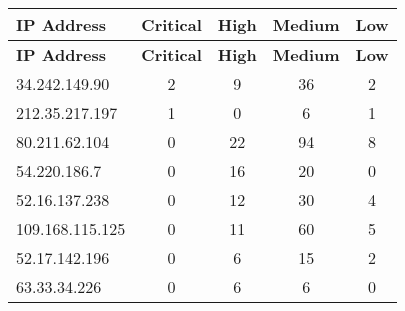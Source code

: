 \documentclass{article}
\begin{document}
\begin{longtable}{|>{\raggedright\arraybackslash}p{3cm}|c|c|c|c|}
    \hline
    \textbf{IP Address} & \textbf{Critical} & \textbf{High} & \textbf{Medium} & \textbf{Low} \\
    \hline
    \endfirsthead
    \hline
    \textbf{IP Address} & \textbf{Critical} & \textbf{High} & \textbf{Medium} & \textbf{Low} \\
    \hline
    \endhead
    \hline
    \endfoot
    \endlastfoot
    
    
    
    \rowcolor{lightred} %
    
    34.242.149.90 & 2 & 9 & 36 & 2 \\
    \hline
    
    
    \rowcolor{lightred} %
    
    212.35.217.197 & 1 & 0 & 6 & 1 \\
    \hline
    
    
    \rowcolor{lightred} %
    
    80.211.62.104 & 0 & 22 & 94 & 8 \\
    \hline
    
    
    \rowcolor{lightred} %
    
    54.220.186.7 & 0 & 16 & 20 & 0 \\
    \hline
    
    
    \rowcolor{lightred} %
    
    52.16.137.238 & 0 & 12 & 30 & 4 \\
    \hline
    
    
    \rowcolor{lightred} %
    
    109.168.115.125 & 0 & 11 & 60 & 5 \\
    \hline
    
    
    \rowcolor{lightred} %
    
    52.17.142.196 & 0 & 6 & 15 & 2 \\
    \hline
    
    
    \rowcolor{lightred} %
    
    63.33.34.226 & 0 & 6 & 6 & 0 \\
    \hline
    

\end{longtable}
\end{document}
